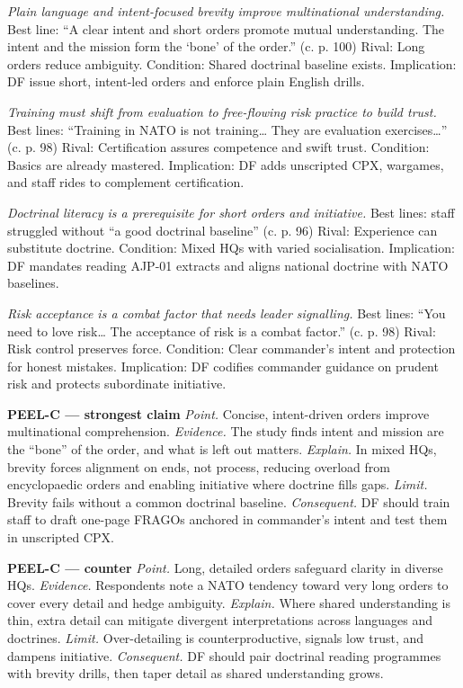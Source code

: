 \textit{Plain language and intent-focused brevity improve multinational understanding.} Best line: “A clear intent and short orders promote mutual understanding. The intent and the mission form the ‘bone’ of the order.” (c. p. 100) Rival: Long orders reduce ambiguity. Condition: Shared doctrinal baseline exists. Implication: DF issue short, intent-led orders and enforce plain English drills.

\textit{Training must shift from evaluation to free-flowing risk practice to build trust.} Best lines: “Training in NATO is not training… They are evaluation exercises…” (c. p. 98) Rival: Certification assures competence and swift trust. Condition: Basics are already mastered. Implication: DF adds unscripted CPX, wargames, and staff rides to complement certification.

\textit{Doctrinal literacy is a prerequisite for short orders and initiative.} Best lines: staff struggled without “a good doctrinal baseline” (c. p. 96) Rival: Experience can substitute doctrine. Condition: Mixed HQs with varied socialisation. Implication: DF mandates reading AJP-01 extracts and aligns national doctrine with NATO baselines.

\textit{Risk acceptance is a combat factor that needs leader signalling.} Best lines: “You need to love risk… The acceptance of risk is a combat factor.” (c. p. 98) Rival: Risk control preserves force. Condition: Clear commander’s intent and protection for honest mistakes. Implication: DF codifies commander guidance on prudent risk and protects subordinate initiative.

\textbf{PEEL-C — strongest claim}
\textit{Point.} Concise, intent-driven orders improve multinational comprehension.
\textit{Evidence.} The study finds intent and mission are the “bone” of the order, and what is left out matters.
\textit{Explain.} In mixed HQs, brevity forces alignment on ends, not process, reducing overload from encyclopaedic orders and enabling initiative where doctrine fills gaps.
\textit{Limit.} Brevity fails without a common doctrinal baseline.
\textit{Consequent.} DF should train staff to draft one-page FRAGOs anchored in commander’s intent and test them in unscripted CPX.

\textbf{PEEL-C — counter}
\textit{Point.} Long, detailed orders safeguard clarity in diverse HQs.
\textit{Evidence.} Respondents note a NATO tendency toward very long orders to cover every detail and hedge ambiguity.
\textit{Explain.} Where shared understanding is thin, extra detail can mitigate divergent interpretations across languages and doctrines.
\textit{Limit.} Over-detailing is counterproductive, signals low trust, and dampens initiative.
\textit{Consequent.} DF should pair doctrinal reading programmes with brevity drills, then taper detail as shared understanding grows.

